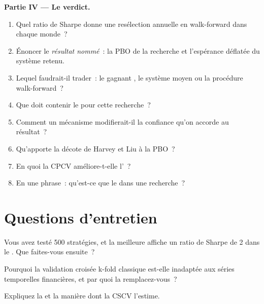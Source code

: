 \begin{problem}
\medskip\noindent\textbf{Partie IV --- Le verdict.}
\begin{enumerate}[resume]
\item Quel ratio de Sharpe donne une resélection annuelle en walk-forward dans chaque monde~?
\item Énoncer le \emph{résultat nommé}~: la PBO de la recherche et l'espérance  déflatée du système retenu.
\item Lequel faudrait-il trader~: le gagnant , le système moyen ou la procédure walk-forward~?
\item Que doit contenir le  pour cette recherche~?
\item Comment un mécanisme modifierait-il la confiance qu'on accorde au résultat~?
\item Qu'apporte la décote de Harvey et Liu à la PBO~?
\item En quoi la CPCV améliore-t-elle l'~?
\item En une phrase~: qu'est-ce que le  dans une recherche~?
\end{enumerate}
\end{problem}

\section{Questions d'entretien}

\begin{interviewq}\label{iq:rs:overfitting:1}
Vous avez testé 500 stratégies, et la meilleure affiche un ratio de Sharpe de 2 dans le . Que faites-vous ensuite~?
\end{interviewq}

\begin{interviewq}\label{iq:rs:overfitting:2}
Pourquoi la validation croisée k-fold classique est-elle inadaptée aux séries temporelles financières, et par quoi la remplacez-vous~?
\end{interviewq}

\begin{interviewq}\label{iq:rs:overfitting:3}
Expliquez la  et la manière dont la CSCV l'estime.
\end{interviewq}

